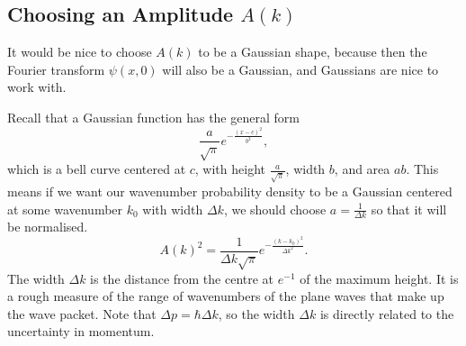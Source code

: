 \documentclass[../quantum_mechanics.tex]{subfiles}
\begin{document}
        \subsection{Choosing an Amplitude $A(k)$}\label{subsec:choosing-an-amplitude}
            It would be nice to choose $A(k)$ to be a Gaussian shape, because then the Fourier transform $\psi(x,0)$ will also be a Gaussian, and Gaussians are nice to work with.
        
            Recall that a Gaussian function has the general form
            \begin{equation}
                \frac{a}{\sqrt{\pi}}e^{-\frac{(x-c)^2}{b^2}},
            \end{equation}
            which is a bell curve centered at $c$, with height $\frac{a}{\sqrt{\pi}}$, width $b$, and area $ab$.
            This means if we want our wavenumber probability density to be a Gaussian centered at some wavenumber $k_0$ with width $\Delta k$, we should choose $a=\frac{1}{\Delta k}$ so that it will be normalised.
            \begin{equation}\label{eq:gaussian-wavenumber-probability-density}
                A(k)^2=\frac{1}{\Delta k\sqrt{\pi}}e^{-\frac{(k-k_0)^2}{\Delta k^2}}.
            \end{equation}
            The width $\Delta k$ is the distance from the centre at $e^{-1}$ of the maximum height.
            It is a rough measure of the range of wavenumbers of the plane waves that make up the wave packet.
            Note that $\Delta p=\hbar\Delta k$, so the width $\Delta k$ is directly related to the uncertainty in momentum.
\end{document}
